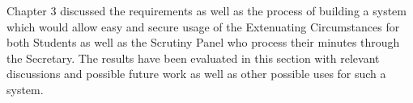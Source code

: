 \documentclass[../main.tex]{subfiles}
\begin{document}
\raggedright
Chapter 3 discussed the requirements as well as the process of building a system which would allow easy and secure usage of the Extenuating Circumstances for both Students as well as the Scrutiny Panel who process their minutes through the Secretary. The results have been evaluated in this section with relevant discussions and possible future work as well as other possible uses for such a system.
\end{document}
